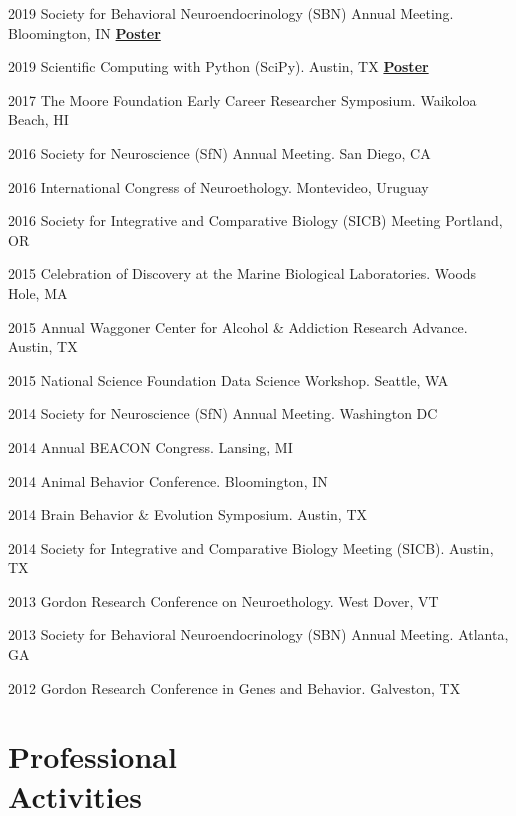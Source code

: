 \documentclass[margin,line]{CV}
\begin{document}
\begin{resume}
\begin{list1}
\item[]2019	Society for Behavioral Neuroendocrinology (SBN) Annual Meeting. Bloomington, IN 
\href{https://www.overleaf.com/read/fwpgzsxhmkxw
}{\textbf{Poster}}
\item[]2019 Scientific Computing with Python (SciPy). Austin, TX \href{https://www.overleaf.com/project/5cc20fbf61491f0afa725048s}{\textbf{Poster}}
\item[]2017 The Moore Foundation Early Career Researcher Symposium. Waikoloa Beach, HI
\item[]2016	Society for Neuroscience (SfN) Annual Meeting. San Diego, CA
\item[]2016	International Congress of Neuroethology. Montevideo, Uruguay
\item[]2016 Society for Integrative and Comparative Biology (SICB) Meeting Portland, OR
\item[]2015	Celebration of Discovery at the Marine Biological Laboratories. Woods Hole, MA
\item[]2015	Annual Waggoner Center for Alcohol \& Addiction Research Advance. Austin, TX
\item[]2015	National Science Foundation Data Science Workshop. Seattle, WA
\item[]2014	Society for Neuroscience (SfN) Annual Meeting. Washington DC
\item[]2014	Annual BEACON Congress. Lansing, MI
\item[]2014	Animal Behavior Conference. Bloomington, IN
\item[]2014	Brain Behavior \& Evolution Symposium. Austin, TX
\item[]2014	Society for Integrative and Comparative Biology Meeting (SICB). Austin, TX
\item[]2013	Gordon Research Conference on Neuroethology. West Dover, VT
\item[]2013	Society for Behavioral Neuroendocrinology (SBN) Annual Meeting. Atlanta, GA
\item[]2012	Gordon Research Conference in Genes and Behavior. Galveston, TX
\end{list1}


    
\section{\mysidestyle Professional\\Activities}


\end{resume}
\end{document}
